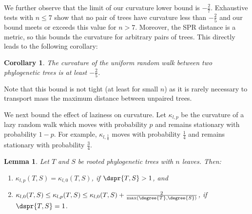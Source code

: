 \documentclass{amsart}
\newtheorem{lemma}[theorem]{Lemma}
\newtheorem{corollary}[theorem]{Corollary}
\begin{document}
We further observe that the limit of our curvature lower bound is $-\frac{2}{7}$.
Exhaustive tests with $n \le 7$ show that no pair of trees have curvature less than $-\frac{2}{5}$ and our bound meets or exceeds this value for $n > 7$.
Moreover, the SPR distance is a metric, so this bounds the curvature for arbitrary pairs of trees.
This directly leads to the following corollary:

\begin{corollary}
	The curvature of the uniform random walk between two phylogenetic trees is at least $-\frac{2}{5}$.
\end{corollary}

Note that this bound is not tight (at least for small $n$) as it is rarely necessary to transport mass the maximum distance between unpaired trees.

We next bound the effect of laziness on curvature. Let $\kappa_{l,p}$ be the curvature of a lazy random walk which moves with probability $p$ and remains stationary with probability $1 - p$. 
For example, $\kappa_{l,\frac{1}{4}}$ moves with probability $\frac{1}{4}$ and remains stationary with probability $\frac{3}{4}$. 

\begin{lemma}
	Let $T$ and $S$ be rooted phylogenetic trees with $n$ leaves.
	Then:
	\begin{enumerate}
		\item	$\kappa_{l,p}(T,S) = \kappa_{l,0}(T,S)$, if $\dspr{T,S} > 1$, and
		\item	$\kappa_{l,0}(T,S) \le \kappa_{l,p}(T,S) \le \kappa_{l,0}(T,S) + \frac{2}{\max(\degree{T}, \degree{S})}$, if $\dspr{T,S} = 1$.
	\end{enumerate}
\end{lemma}
\end{document}
